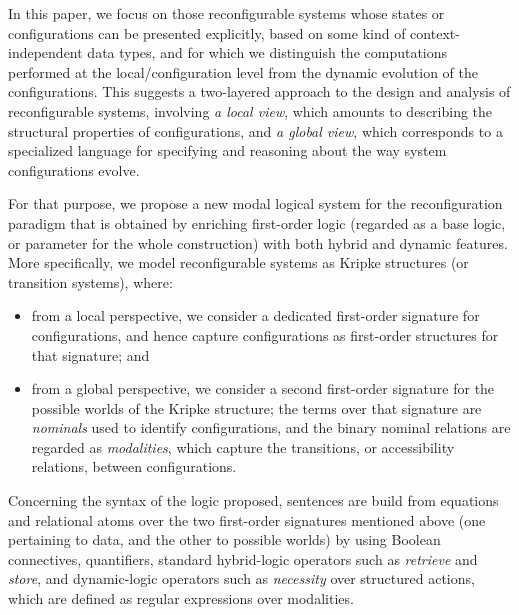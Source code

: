 \documentclass[a4paper,UKenglish,cleveref, autoref]{lipics-v2019}
\begin{document}
In this paper, we focus on those reconfigurable systems
whose states or configurations can be presented explicitly, based on some kind of context-independent data types,
and for which we distinguish the computations performed at the local/configuration level from the dynamic evolution of the configurations.
This suggests a two-layered approach to the design and analysis of reconfigurable systems, involving
\emph{a local view}, which amounts to describing the structural properties of configurations, and
\emph{a global view}, which corresponds to a specialized language for specifying and reasoning about the way system configurations evolve.

For that purpose, we propose a new modal logical system for the reconfiguration paradigm that is obtained by enriching first-order logic (regarded as a base logic, or parameter for the whole construction) with both hybrid and dynamic features.
More specifically, we model reconfigurable systems as Kripke structures (or transition systems), where:
\begin{itemize}
  
\item from a local perspective, we consider a dedicated first-order signature for configurations, and hence capture configurations as first-order structures for that signature; and

\item from a global perspective, we consider a second first-order signature for the possible worlds of the Kripke structure;
  the terms over that signature are \emph{nominals} used to identify configurations, and the binary nominal relations are regarded as \emph{modalities}, which capture the transitions, or accessibility relations, between configurations.
  
\end{itemize}
Concerning the syntax of the logic proposed, sentences are build from equations and relational atoms over the two first-order signatures mentioned above (one pertaining to data, and the other to possible worlds) by using Boolean connectives, quantifiers, standard hybrid-logic operators such as \emph{retrieve} and \emph{store}, and dynamic-logic operators such as \emph{necessity} over structured actions, which are defined as regular expressions over modalities.
\end{document}

